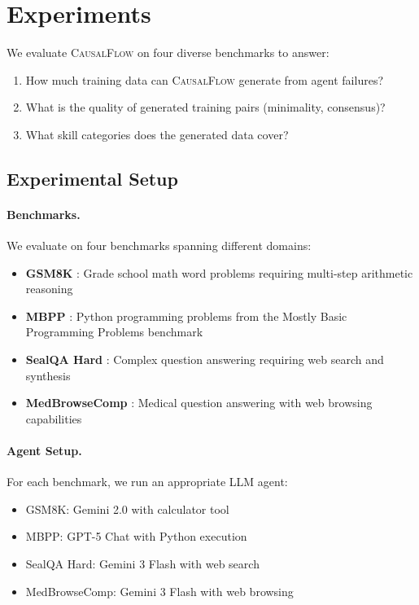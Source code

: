 \documentclass{article}
\theoremstyle{plain}
\theoremstyle{definition}
\theoremstyle{remark}
\begin{document}
\section{Experiments}

We evaluate \textsc{CausalFlow} on four diverse benchmarks to answer:
\begin{enumerate}
    \item[\textbf{Q1}] How much training data can \textsc{CausalFlow} generate from agent failures?
    \item[\textbf{Q2}] What is the quality of generated training pairs (minimality, consensus)?
    \item[\textbf{Q3}] What skill categories does the generated data cover?
\end{enumerate}

\subsection{Experimental Setup}

\paragraph{Benchmarks.}
We evaluate on four benchmarks spanning different domains:
\begin{itemize}
    \item \textbf{GSM8K} \cite{cobbe2021gsm8k}: Grade school math word problems requiring multi-step arithmetic reasoning
    \item \textbf{MBPP} \cite{austin2021program}: Python programming problems from the Mostly Basic Programming Problems benchmark
    \item \textbf{SealQA Hard} \cite{pham2025sealqa}: Complex question answering requiring web search and synthesis
    \item \textbf{MedBrowseComp} \cite{chen2025medbrowsecomp}: Medical question answering with web browsing capabilities
\end{itemize}

\paragraph{Agent Setup.}
For each benchmark, we run an appropriate LLM agent:
\begin{itemize}
    \item GSM8K: Gemini 2.0 with calculator tool
    \item MBPP: GPT-5 Chat with Python execution
    \item SealQA Hard: Gemini 3 Flash with web search
    \item MedBrowseComp: Gemini 3 Flash with web browsing
\end{itemize}
\end{document}
